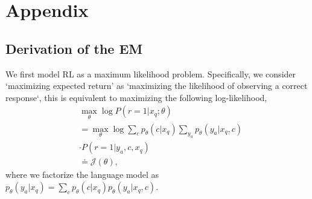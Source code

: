 
\section{Appendix}

\subsection{Derivation of the EM}\label{app_em}
We first model RL as a maximum likelihood problem. Specifically, we consider `maximizing expected return' as `maximizing the likelihood of observing a correct response`, this is equivalent to maximizing the following log-likelihood,
\begin{align*}
    &\max_\theta \log P(r=1 | x_q;\theta) \\
    &= \max_\theta \log \sum_{c} p_\theta(c | x_q)\sum_{y_a}p_\theta(y_a | x_q,c)\\&\cdot P(r=1 | y_a,c,x_q) \\
    &\doteq \mathcal{J}(\theta),
\end{align*}
where we factorize the language model as \( p_\theta(y_a | x_q) = \sum_c p_\theta(c | x_q) p_\theta (y_a | x_q, c) \).


